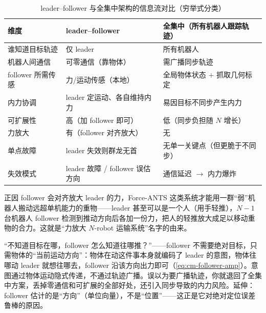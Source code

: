 \begin{table}[H]\centering\small
\caption{leader--follower 与全集中架构的信息流对比（穷举式分类）}
\label{tab:cm-lf-vs-central}
\begin{tabular}{p{3.4cm}p{4.4cm}p{4.4cm}}
\toprule
维度 & leader--follower & 全集中（所有机器人跟踪轨迹） \\
\midrule
谁知道目标轨迹 & 仅 leader & 所有机器人 \\
机器人间通信 & 可零通信（靠物体） & 需广播同步轨迹 \\
follower 所需传感 & 力/运动传感（本地） & 全局物体状态 $+$ 抓取几何标定 \\
内力协调 & leader 定运动、各自维持内力 & 易因目标不同步产生内力 \\
可扩展性 & 高（加 follower 即可） & 低（同步负担随 $N$ 增长） \\
力放大 & 有（follower 对齐放大） & 无 \\
单点故障 & leader 失效则群龙无首 & 无单一关键点（但更脆于不同步） \\
失效模式 & leader 故障 / follower 误估方向 & 通信延迟 $\to$ 内力爆炸 \\
\bottomrule
\end{tabular}
\end{table}

\begin{insight}
正因 follower 会对齐放大 leader 的力，Force-ANTS 这类系统才能用一群“弱”机器人搬动远超单机能力的重物——leader 甚至可以是一个人（用手轻推），$N-1$ 台机器人 follower 检测到推动方向后各加一份力，把人的轻推放大成足以移动重物的合力。这就是“力放大 $N$-robot 运输系统”名字的由来。
\end{insight}

\begin{pitfall}
“不知道目标在哪，follower 怎么知道往哪推？”——follower 不需要绝对目标，只需物体的“当前运动方向”：物体在动这件事本身就编码了 leader 的意图，物体往哪动 leader 就想往哪去，follower 沿该方向出力即可（\cref{eq:cm-follower-amp}）。意图通过物体运动隐式传递，不通过轨迹广播。误以为要广播轨迹，你就退回了全集中方案，丢掉零通信和可扩展的全部好处，还引入同步导致的内力风险。延伸：follower 估计的是“方向”（单位向量），不是“位置”——这正是它对绝对定位误差鲁棒的原因。
\end{pitfall}


